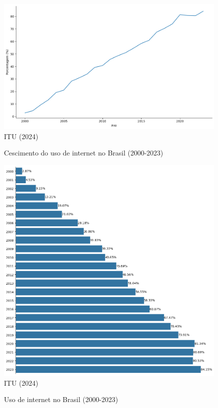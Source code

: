 \begin{figure}[ht]
    \centering
    \caption{Cescimento do uso de internet no Brasil (2000-2023)}
    \includegraphics[width=1\linewidth]{figuras/internet/lineplot_uso_internet_brasil_itu.png}
    \label{fig:crescimento_internet_brasil_itu.png}
    \footnotesize{ITU (2024)}
\end{figure}

\begin{figure}[ht]
    \centering
    \caption{Uso de internet no Brasil (2000-2023)}
    \includegraphics[width=1\linewidth]{figuras/internet/barplot_uso_internet_brasil_itu.png}
    \label{fig:uso_internet_brasil_itu.png}
    \footnotesize{ITU (2024)}
\end{figure}


